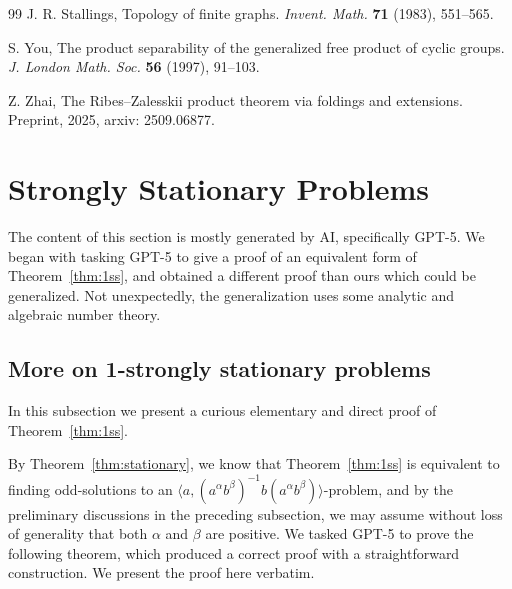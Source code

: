\documentclass[10pt,a4paper]{amsart}
\theoremstyle{definition}
\theoremstyle{definition}
\numberwithin{equation}{section}
\begin{document}
\begin{thebibliography}{99}
J. R. Stallings, 
Topology of finite graphs. \textit{Invent. Math.} {\bf 71} (1983), 551--565.

S. You,
The product separability of the generalized free product of cyclic groups.
\textit{J. London Math. Soc.} {\bf 56} (1997), 91--103.

Z. Zhai,
The Ribes--Zalesskii product theorem via foldings and extensions.
Preprint, 2025, arxiv: 2509.06877.




\end{thebibliography}

\section{Strongly Stationary Problems}
The content of this section is mostly generated by AI, specifically GPT-5. We began with tasking GPT-5 to give a proof of an equivalent form of Theorem~\ref{thm:1ss}, and obtained a different proof than ours which could be generalized. Not unexpectedly, the generalization uses some analytic and algebraic number theory.

\subsection{More on 1-strongly stationary problems}
In this subsection we present a curious elementary and direct proof of Theorem~\ref{thm:1ss}.

By Theorem~\ref{thm:stationary}, we know that Theorem~\ref{thm:1ss} is equivalent to finding odd-solutions to an $\langle a, (a^\alpha b^\beta)^{-1}b(a^\alpha b^\beta)\rangle$-problem, and by the preliminary discussions in the preceding subsection, we may assume without loss of generality that both $\alpha$ and $\beta$ are positive. We tasked GPT-5 to prove the following theorem, which produced a correct proof with a straightforward construction. We present the proof here verbatim.
\end{document}
